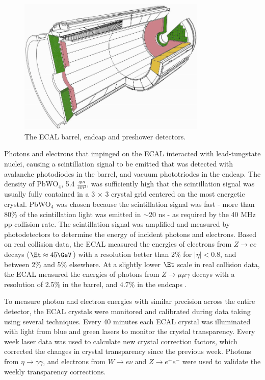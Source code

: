 \begin{figure}[ht]
	\centering
	\includegraphics[width=0.8\textwidth]{figures/ecalBarrelEndcapAndPreshower.png}
	\caption{The ECAL barrel, endcap and preshower detectors.}
	\label{fig:ecalEBEEandES}
\end{figure}

Photons and electrons that impinged on the ECAL interacted with lead-tungstate nuclei, causing a scintillation 
signal to be emitted that was detected with avalanche photodiodes in the barrel, and vacuum phototriodes in the 
endcap.  The density of PbWO$_{4}$, 5.4 $\frac{gm}{cm^{3}}$, 
was sufficiently high that the scintillation signal was usually fully contained in a 3 $\times$ 3 crystal 
grid centered on the most energetic crystal.  PbWO$_{4}$ was chosen because the scintillation signal was fast - 
more than 80\% of the scintillation light was emitted in $\sim$20 ns - as required by the 40 MHz pp collision rate.  
The scintillation signal was amplified and measured by photodetectors to determine the energy of incident 
photons and electrons.  Based on real collision data, the ECAL measured the energies of electrons from $Z \rightarrow ee$ 
decays ($\Et \approx 45 \GeV$) with a resolution better than 2\% for $|\eta| < 0.8$, and between 2\% and 5\% elsewhere.  
At a slightly lower $\Et$ scale in real collision data, the ECAL measured the energies of photons from $Z \rightarrow \mu\mu\gamma$ 
decays with a resolution of 2.5\% in the barrel, and 4.7\% in the endcaps \cite{ecalPerformanceInCollisions}.

To measure photon and electron energies with similar precision across the entire detector, the ECAL crystals were 
monitored and calibrated during data taking using several techniques.  Every 40 minutes each ECAL crystal was illuminated 
with light from blue and green lasers to monitor the crystal transparency.  Every week laser data 
was used to calculate new crystal correction factors, which corrected the changes in crystal transparency 
since the previous week.  Photons from $\eta \rightarrow \gamma\gamma$, and electrons from 
$W \rightarrow e\nu$ and $Z \rightarrow e^{+}e^{-}$ were used to validate the weekly transparency corrections.


